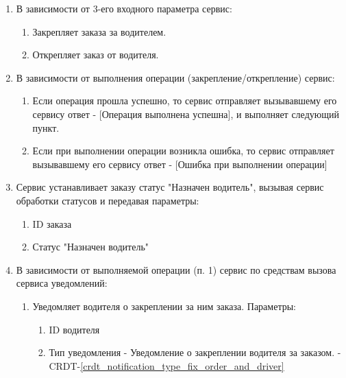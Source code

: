         \begin{alg} \label{alg_order_fastening} \mbox{}

	        \begin{enumerate}

	          \item В зависимости от 3-его входного параметра сервис:

              \begin{enumerate}
                \item Закрепляет заказа за водителем.
                \item Открепляет заказ от водителя.
              \end{enumerate}
	          
	          \item В зависимости от выполнения операции (закрепление/открепление) сервис:

              \begin{enumerate}
                \item Если операция прошла успешно, то сервис отправляет вызывавшему его сервису ответ - [Операция выполнена успешна], и выполняет следующий пункт.
                \item Если  при выполнении операции возникла ошибка, то сервис отправляет вызывавшему его сервису ответ - [Ошибка при выполнении операции]
              \end{enumerate}

            \item Сервис устанавливает заказу статус "Назначен водитель", вызывая сервис обработки статусов и передавая параметры:

              \begin{enumerate}
                \item ID заказа
                \item Статус "Назначен водитель"
              \end{enumerate}

            \item В зависимости от выполняемой операции (п. 1) сервис по средствам вызова сервиса уведомлений:

              \begin{enumerate}
                \item Уведомляет водителя о закреплении за ним заказа. Параметры:

                  \begin{enumerate}
                    \item ID водителя
                    \item Тип уведомления - Уведомление о закреплении водителя за заказом.  - CRDT-\ref{crdt_notification_type_fix_order_and_driver}
                  \end{enumerate}


\end{enumerate}
\end{enumerate}
\end{alg}
